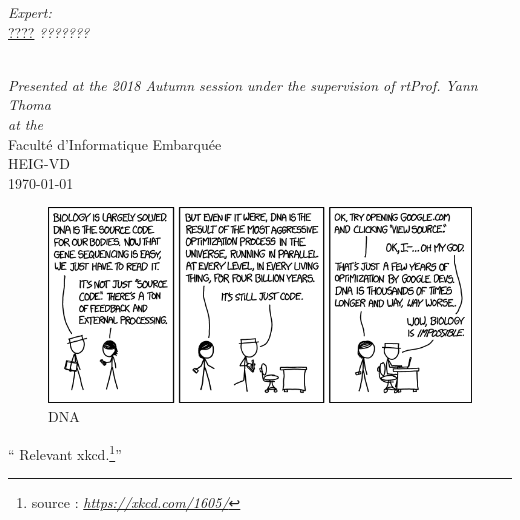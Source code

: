 \documentclass[
11pt, %
english, %
singlespacing, %
headsepline, %
]{MastersDoctoralThesis} %
\begin{document}
\begin{titlepage}
\begin{center}
\begin{minipage}[t]{0.4\textwidth}
\begin{flushright}
\emph{Expert:} \\
\href{http://www.jamessmith.com}{\textcolor{bleu}{????}} \linebreak 
\textit{\small{???????}}
\end{flushright}
\end{minipage}\\[1.5cm]

\large \textit{Presented at the 2018 Autumn session under the supervision \linebreak of rtProf. Yann Thoma}\\[0.3cm] %
\textit{at the}\\[0.4cm]\textcolor{bleu}{
Faculté d'Informatique Embarquée \\ HEIG-VD}\\[1cm] %
{\large \today}\\ %
\vfill
\end{center}
\end{titlepage}

\thispagestyle{empty}
\newpage

\vspace*{0.2\textheight}


\begin{figure}[h]
	\centering

	\includegraphics[scale = 0.6]{Figures/xkcd.png}
		\captionsetup{labelformat=empty}%
	\caption{DNA}
	\label{XKCD}
\end{figure}

\noindent\enquote{ Relevant xkcd.\footnote{source : \textit{\href{https://xkcd.com/1605/}{https://xkcd.com/1605/}}}}\bigbreak
\end{document}
